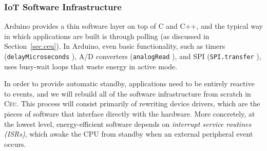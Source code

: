 \documentclass[12pt,english]{amsart}
\newcommand{\CEU}{\textsc{C\'{e}u}\xspace}
\newcommand{\code}[1] {{\small{\texttt{#1}}}}
\begin{document}
\subsubsection{IoT Software Infrastructure}
\label{sec.method.software}

Arduino provides a thin software layer on top of C and C++, and the typical way
in which applications are built is through polling (as discussed in
Section~\ref{sec.ceu}).
In Arduino, even basic functionality, such as timers
    (\code{delayMicroseconds}%
    ),
A/D converters
    (\code{analogRead}%
    ),
and SPI
    (\code{SPI.transfer}%
    ),
uses busy-wait loops that waste energy in active mode.

In order to provide automatic standby, applications need to be entirely
reactive to events, and we will rebuild all of the software infrastructure from
scratch in \CEU.
%
This process will consist primarily of rewriting device drivers, which are the
pieces of software that interface directly with the hardware.
%
More concretely, at the lowest level, energy-efficient software depends on
\emph{interrupt service routines (ISRs)}, which awake the CPU from standby when
an external peripheral event occurs.
\end{document}
